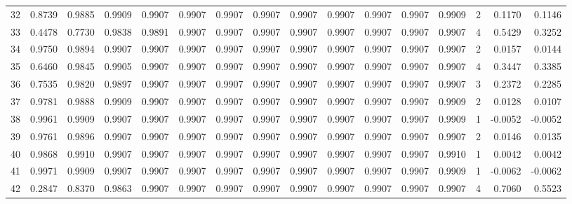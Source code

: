 \begin{tabular}{lrrrrrrrrrrrrrrr}
32  &      0.8739 &  0.9885 &  0.9909 &  0.9907 &  0.9907 &  0.9907 &  0.9907 &  0.9907 &  0.9907 &  0.9907 &   0.9907 &     0.9909 &      2 &                    0.1170 &                     0.1146 \\
33  &      0.4478 &  0.7730 &  0.9838 &  0.9891 &  0.9907 &  0.9907 &  0.9907 &  0.9907 &  0.9907 &  0.9907 &   0.9907 &     0.9907 &      4 &                    0.5429 &                     0.3252 \\
34  &      0.9750 &  0.9894 &  0.9907 &  0.9907 &  0.9907 &  0.9907 &  0.9907 &  0.9907 &  0.9907 &  0.9907 &   0.9907 &     0.9907 &      2 &                    0.0157 &                     0.0144 \\
35  &      0.6460 &  0.9845 &  0.9905 &  0.9907 &  0.9907 &  0.9907 &  0.9907 &  0.9907 &  0.9907 &  0.9907 &   0.9907 &     0.9907 &      4 &                    0.3447 &                     0.3385 \\
36  &      0.7535 &  0.9820 &  0.9897 &  0.9907 &  0.9907 &  0.9907 &  0.9907 &  0.9907 &  0.9907 &  0.9907 &   0.9907 &     0.9907 &      3 &                    0.2372 &                     0.2285 \\
37  &      0.9781 &  0.9888 &  0.9909 &  0.9907 &  0.9907 &  0.9907 &  0.9907 &  0.9907 &  0.9907 &  0.9907 &   0.9907 &     0.9909 &      2 &                    0.0128 &                     0.0107 \\
38  &      0.9961 &  0.9909 &  0.9907 &  0.9907 &  0.9907 &  0.9907 &  0.9907 &  0.9907 &  0.9907 &  0.9907 &   0.9907 &     0.9909 &      1 &                   -0.0052 &                    -0.0052 \\
39  &      0.9761 &  0.9896 &  0.9907 &  0.9907 &  0.9907 &  0.9907 &  0.9907 &  0.9907 &  0.9907 &  0.9907 &   0.9907 &     0.9907 &      2 &                    0.0146 &                     0.0135 \\
40  &      0.9868 &  0.9910 &  0.9907 &  0.9907 &  0.9907 &  0.9907 &  0.9907 &  0.9907 &  0.9907 &  0.9907 &   0.9907 &     0.9910 &      1 &                    0.0042 &                     0.0042 \\
41  &      0.9971 &  0.9909 &  0.9907 &  0.9907 &  0.9907 &  0.9907 &  0.9907 &  0.9907 &  0.9907 &  0.9907 &   0.9907 &     0.9909 &      1 &                   -0.0062 &                    -0.0062 \\
42  &      0.2847 &  0.8370 &  0.9863 &  0.9907 &  0.9907 &  0.9907 &  0.9907 &  0.9907 &  0.9907 &  0.9907 &   0.9907 &     0.9907 &      4 &                    0.7060 &                     0.5523 \\

\end{tabular}
